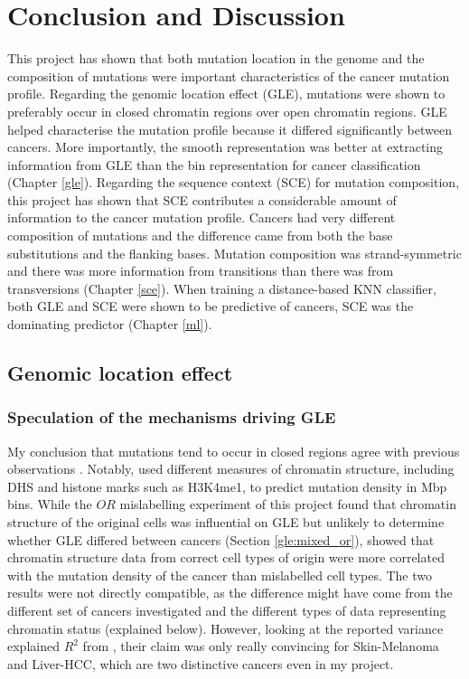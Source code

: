 \chapter{Conclusion and Discussion}\label{discussion}

This project has shown that both mutation location in the genome and the composition of mutations were important characteristics of the cancer mutation profile. Regarding the genomic location effect (GLE), mutations were shown to preferably occur in closed chromatin regions over open chromatin regions. GLE helped characterise the mutation profile because it differed significantly between cancers. More importantly, the smooth representation was better at extracting information from GLE than the bin representation for cancer classification (Chapter \ref{gle}). Regarding the sequence context (SCE) for mutation composition, this project has shown that SCE contributes a considerable amount of information to the cancer mutation profile. Cancers had very different composition of mutations and the difference came from both the base substitutions and the flanking bases. Mutation composition was strand-symmetric and there was more information from transitions than there was from transversions (Chapter \ref{sce}). When training a distance-based KNN classifier, both GLE and SCE were shown to be predictive of cancers, SCE was the dominating predictor (Chapter \ref{ml}).

\section{Genomic location effect}
\subsection{Speculation of the mechanisms driving GLE}
My conclusion that mutations tend to occur in closed regions agree with previous observations \citep{Polak2015,Fujimoto2016Whole-genomeCancer,Prendergast2007ChromatinGenome}. Notably, \citet{Polak2015} used different measures of chromatin structure, including DHS and histone marks such as H3K4me1, to predict mutation density in Mbp bins. While the $OR$ mislabelling experiment of this project found that chromatin structure of the original cells was influential on GLE but unlikely to determine whether GLE differed between cancers (Section \ref{gle:mixed_or}), \citet{Polak2015} showed that chromatin structure data from correct cell types of origin were more correlated with the mutation density of the cancer than mislabelled cell types. The two results were not directly compatible, as the difference might have come from the different set of cancers investigated and the different types of data representing chromatin status (explained below). However, looking at the reported variance explained $R^2$ from \citet{Polak2015}, their claim was only really convincing for Skin-Melanoma and Liver-HCC, which are two distinctive cancers even in my project. 

